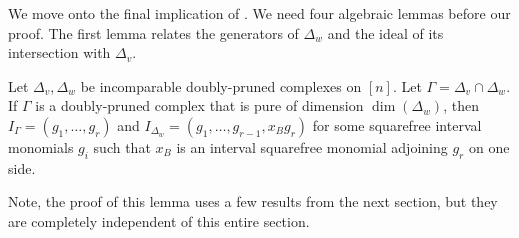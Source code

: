 We move onto the final implication of . 
We need four algebraic lemmas before our proof.
The first lemma relates the generators of $\Delta_w$ and the ideal of its intersection with $\Delta_v$.

\begin{lemma}\label{lem:mumbo-generator-jumbo} %
    Let $\Delta_v,\Delta_w$ be incomparable doubly-pruned complexes on $[n]$. Let $\Gamma = \Delta_v\cap \Delta_w$. If $\Gamma$ is a doubly-pruned complex that is pure of dimension $\dim(\Delta_w)$, then $I_{\Gamma} = (g_1,\dots, g_r)$ and $I_{\Delta_w} = (g_1,\dots, g_{r-1},x_B g_r)$ for some squarefree interval monomials $g_i$ such that $x_B$ is an interval squarefree monomial adjoining $g_r$ on one side.
\end{lemma}

Note, the proof of this lemma uses a few results from the next section, but they are completely independent of this entire section.

